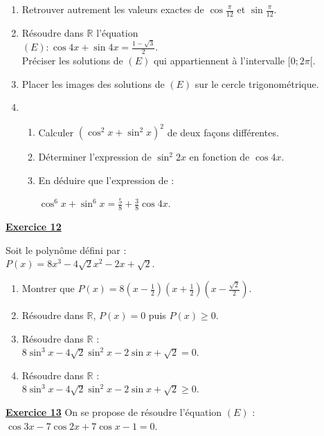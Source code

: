 \documentclass[12pt,a4paper]{article}
\begin{document}
\begin{multicols}{2}
\begin{enumerate}
    \item Retrouver autrement les valeurs exactes de \( \cos \frac{\pi}{12} \) et \( \sin \frac{\pi}{12} \).

    \item Résoudre dans \( \mathbb{R} \) l’équation\\
    \( (E) : \cos 4x + \sin 4x = \frac{1 - \sqrt{3}}{2} \).\\
    Préciser les solutions de \( (E) \) qui appartiennent à l’intervalle \( [0 ; 2\pi[ \).

    \item Placer les images des solutions de \( (E) \) sur le cercle trigonométrique.

    \item 
    \begin{enumerate}
        \item Calculer \( (\cos^2 x + \sin^2 x)^2 \) de deux façons différentes.
        \item Déterminer l’expression de \( \sin^2 2x \) en fonction de \( \cos 4x \).
        \item En déduire que l’expression de :
        
        \( \cos^6 x + \sin^6 x = \frac{5}{8} + \frac{3}{8} \cos 4x \).
    \end{enumerate}
\end{enumerate}
\textbf{\underline{Exercice 12}}

Soit le polynôme défini par :\\
\( P(x) = 8x^3 - 4\sqrt{2}x^2 - 2x + \sqrt{2} \).

\begin{enumerate}
    \item Montrer que \( P(x) = 8\left(x - \frac{1}{2}\right)\left(x + \frac{1}{2}\right)\left(x - \frac{\sqrt{2}}{2}\right) \).

    \item Résoudre dans \( \mathbb{R} \), \( P(x) = 0 \) puis \( P(x) \geq 0 \).

    \item Résoudre dans \( \mathbb{R} \) :\\
    \( 8 \sin^3 x - 4\sqrt{2} \sin^2 x - 2 \sin x + \sqrt{2} = 0 \).

    \item Résoudre dans \( \mathbb{R} \) :\\
    \( 8 \sin^3 x - 4\sqrt{2} \sin^2 x - 2 \sin x + \sqrt{2} \geq 0 \).
\end{enumerate}
\textbf{\underline{Exercice 13}}
On se propose de résoudre l’équation \( (E) \) :\\
\( \cos 3x - 7 \cos 2x + 7 \cos x - 1 = 0 \).


\end{multicols}
\end{document}
